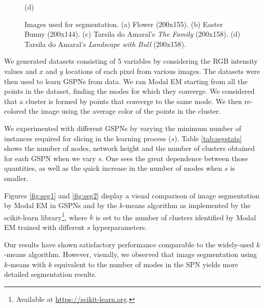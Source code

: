 \begin{figure}
\begin{minipage}{0.5\textwidth}

    (d)
  \end{minipage}

  \caption[Images used for segmentation (Flower, Easter Bunny, The Family, Landscape with Bull)]{Images used for segmentation. (a) Flower (200x155). (b) Easter Bunny (200x144). (c) Tarsila do Amaral's \emph{The Family} (200x158). (d) Tarsila do Amaral's \emph{Landscape with Bull} (200x158).}
  \label{fig:segoriginals}
\end{figure}

We generated datasets consisting of 5 variables by considering the RGB intensity values and $x$ and $y$ locations of each pixel from various images. The datasets were then used to learn GSPNs from data. We ran Modal EM starting from all the points in the dataset, finding the modes for which they converge. We considered that a cluster is formed by points that converge to the same mode. We then re-colored the image using the average color of the points in the cluster.

We experimented with different GSPNs by varying the minimum number of instances required for slicing in the learning process ($s$). Table \ref{tab:segstats} shows the number of nodes, network height and the number of clusters obtained for each GSPN when we vary $s$. One sees the great dependence between those quantities, as well as the quick increase in the number of modes when $s$ is smaller.

Figures \ref{fig:seg1} and \ref{fig:seg2} display a visual comparison of image segmentation by Modal EM in GSPNs and by the $k$-means algorithm as implemented by the scikit-learn library\footnote{Available at \url{https://scikit-learn.org}.}, where $k$ is set to the number of clusters identified by Modal EM trained with different $s$ hyperparameters.

Our results have shown satisfactory performance comparable to the widely-used $k$-means algorithm. However, visually, we observed that image segmentation using $k$-means with $k$ equivalent to the number of modes in the SPN yields more detailed segmentation results.

